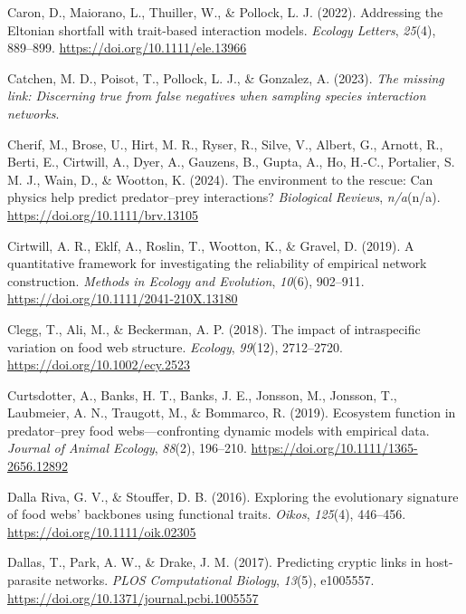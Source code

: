 \documentclass[
]{article}
\newlength{\cslhangindent}
\newenvironment{CSLReferences}[2] %
 {\begin{list}{}{%
  \setlength{\itemindent}{0pt}
  \setlength{\leftmargin}{0pt}
  \setlength{\parsep}{0pt}
  \ifodd #1
   \setlength{\leftmargin}{\cslhangindent}
   \setlength{\itemindent}{-1\cslhangindent}
  \fi
  \setlength{\itemsep}{#2\baselineskip}}}
 {\end{list}}
\begin{document}
\begin{CSLReferences}{1}{0}
Caron, D., Maiorano, L., Thuiller, W., \& Pollock, L. J. (2022).
Addressing the {Eltonian} shortfall with trait-based interaction models.
\emph{Ecology Letters}, \emph{25}(4), 889--899.
\url{https://doi.org/10.1111/ele.13966}

Catchen, M. D., Poisot, T., Pollock, L. J., \& Gonzalez, A. (2023).
\emph{The missing link: Discerning true from false negatives when
sampling species interaction networks}.

Cherif, M., Brose, U., Hirt, M. R., Ryser, R., Silve, V., Albert, G.,
Arnott, R., Berti, E., Cirtwill, A., Dyer, A., Gauzens, B., Gupta, A.,
Ho, H.-C., Portalier, S. M. J., Wain, D., \& Wootton, K. (2024). The
environment to the rescue: Can physics help predict predator--prey
interactions? \emph{Biological Reviews}, \emph{n/a}(n/a).
\url{https://doi.org/10.1111/brv.13105}

Cirtwill, A. R., Eklf, A., Roslin, T., Wootton, K., \& Gravel, D.
(2019). A quantitative framework for investigating the reliability of
empirical network construction. \emph{Methods in Ecology and Evolution},
\emph{10}(6), 902--911. \url{https://doi.org/10.1111/2041-210X.13180}

Clegg, T., Ali, M., \& Beckerman, A. P. (2018). The impact of
intraspecific variation on food web structure. \emph{Ecology},
\emph{99}(12), 2712--2720. \url{https://doi.org/10.1002/ecy.2523}

Curtsdotter, A., Banks, H. T., Banks, J. E., Jonsson, M., Jonsson, T.,
Laubmeier, A. N., Traugott, M., \& Bommarco, R. (2019). Ecosystem
function in predator--prey food webs---confronting dynamic models with
empirical data. \emph{Journal of Animal Ecology}, \emph{88}(2),
196--210. \url{https://doi.org/10.1111/1365-2656.12892}

Dalla Riva, G. V., \& Stouffer, D. B. (2016). Exploring the evolutionary
signature of food webs' backbones using functional traits. \emph{Oikos},
\emph{125}(4), 446--456. \url{https://doi.org/10.1111/oik.02305}

Dallas, T., Park, A. W., \& Drake, J. M. (2017). Predicting cryptic
links in host-parasite networks. \emph{PLOS Computational Biology},
\emph{13}(5), e1005557.
\url{https://doi.org/10.1371/journal.pcbi.1005557}


\end{CSLReferences}
\end{document}
